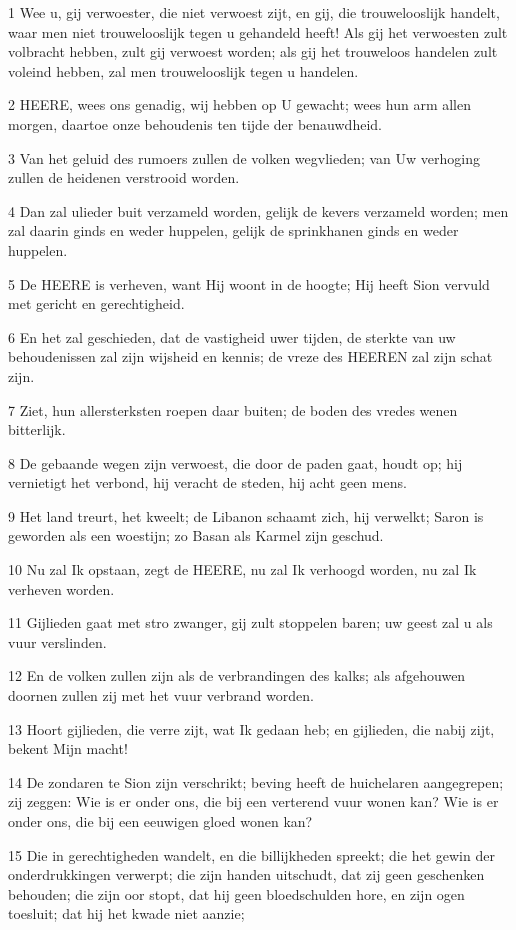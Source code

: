 \par 1 Wee u, gij verwoester, die niet verwoest zijt, en gij, die trouwelooslijk handelt, waar men niet trouwelooslijk tegen u gehandeld heeft! Als gij het verwoesten zult volbracht hebben, zult gij verwoest worden; als gij het trouweloos handelen zult voleind hebben, zal men trouwelooslijk tegen u handelen.
\par 2 HEERE, wees ons genadig, wij hebben op U gewacht; wees hun arm allen morgen, daartoe onze behoudenis ten tijde der benauwdheid.
\par 3 Van het geluid des rumoers zullen de volken wegvlieden; van Uw verhoging zullen de heidenen verstrooid worden.
\par 4 Dan zal ulieder buit verzameld worden, gelijk de kevers verzameld worden; men zal daarin ginds en weder huppelen, gelijk de sprinkhanen ginds en weder huppelen.
\par 5 De HEERE is verheven, want Hij woont in de hoogte; Hij heeft Sion vervuld met gericht en gerechtigheid.
\par 6 En het zal geschieden, dat de vastigheid uwer tijden, de sterkte van uw behoudenissen zal zijn wijsheid en kennis; de vreze des HEEREN zal zijn schat zijn.
\par 7 Ziet, hun allersterksten roepen daar buiten; de boden des vredes wenen bitterlijk.
\par 8 De gebaande wegen zijn verwoest, die door de paden gaat, houdt op; hij vernietigt het verbond, hij veracht de steden, hij acht geen mens.
\par 9 Het land treurt, het kweelt; de Libanon schaamt zich, hij verwelkt; Saron is geworden als een woestijn; zo Basan als Karmel zijn geschud.
\par 10 Nu zal Ik opstaan, zegt de HEERE, nu zal Ik verhoogd worden, nu zal Ik verheven worden.
\par 11 Gijlieden gaat met stro zwanger, gij zult stoppelen baren; uw geest zal u als vuur verslinden.
\par 12 En de volken zullen zijn als de verbrandingen des kalks; als afgehouwen doornen zullen zij met het vuur verbrand worden.
\par 13 Hoort gijlieden, die verre zijt, wat Ik gedaan heb; en gijlieden, die nabij zijt, bekent Mijn macht!
\par 14 De zondaren te Sion zijn verschrikt; beving heeft de huichelaren aangegrepen; zij zeggen: Wie is er onder ons, die bij een verterend vuur wonen kan? Wie is er onder ons, die bij een eeuwigen gloed wonen kan?
\par 15 Die in gerechtigheden wandelt, en die billijkheden spreekt; die het gewin der onderdrukkingen verwerpt; die zijn handen uitschudt, dat zij geen geschenken behouden; die zijn oor stopt, dat hij geen bloedschulden hore, en zijn ogen toesluit; dat hij het kwade niet aanzie;
